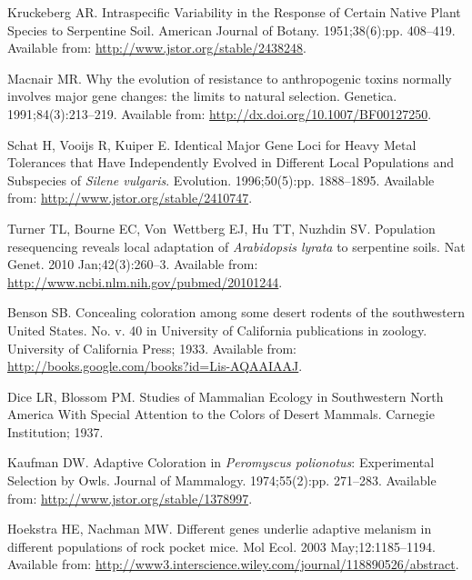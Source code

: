 \documentclass[10pt,letterpaper]{article}
\begin{document}
\begin{thebibliography}{10}
Kruckeberg AR.
\newblock Intraspecific Variability in the Response of Certain Native Plant
  Species to Serpentine Soil.
\newblock American Journal of Botany. 1951;38(6):pp. 408--419.
\newblock Available from: \url{http://www.jstor.org/stable/2438248}.

Macnair MR.
\newblock Why the evolution of resistance to anthropogenic toxins normally
  involves major gene changes: the limits to natural selection.
\newblock Genetica. 1991;84(3):213--219.
\newblock Available from: \url{http://dx.doi.org/10.1007/BF00127250}.

Schat H, Vooijs R, Kuiper E.
\newblock Identical Major Gene Loci for Heavy Metal Tolerances that Have
  Independently Evolved in Different Local Populations and Subspecies of
  \textit{{Silene} vulgaris}.
\newblock Evolution. 1996;50(5):pp. 1888--1895.
\newblock Available from: \url{http://www.jstor.org/stable/2410747}.

Turner TL, Bourne EC, Von~Wettberg EJ, Hu TT, Nuzhdin SV.
\newblock Population resequencing reveals local adaptation of
  \textit{{Arabidopsis} lyrata} to serpentine soils.
\newblock Nat Genet. 2010 Jan;42(3):260--3.
\newblock Available from: \url{http://www.ncbi.nlm.nih.gov/pubmed/20101244}.

Benson SB.
\newblock Concealing coloration among some desert rodents of the southwestern
  United States.
\newblock No. v. 40 in University of California publications in zoology.
  University of California Press; 1933.
\newblock Available from: \url{http://books.google.com/books?id=Lis-AQAAIAAJ}.

Dice LR, Blossom PM.
\newblock Studies of Mammalian Ecology in Southwestern North America With
  Special Attention to the Colors of Desert Mammals.
\newblock Carnegie Institution; 1937.

Kaufman DW.
\newblock Adaptive Coloration in \textit{{Peromyscus} polionotus}: Experimental
  Selection by Owls.
\newblock Journal of Mammalogy. 1974;55(2):pp. 271--283.
\newblock Available from: \url{http://www.jstor.org/stable/1378997}.

Hoekstra HE, Nachman MW.
\newblock Different genes underlie adaptive melanism in different populations
  of rock pocket mice.
\newblock Mol Ecol. 2003 May;12:1185--1194.
\newblock Available from:
  \url{http://www3.interscience.wiley.com/journal/118890526/abstract}.


\end{thebibliography}
\end{document}

